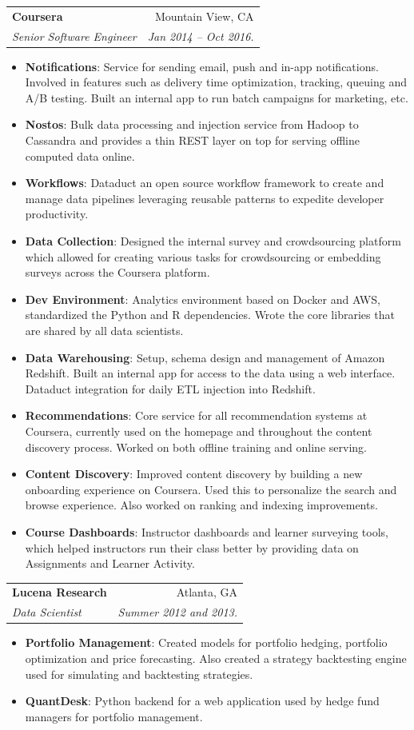 \documentclass[letterpaper,11pt]{article}
\makeatletter
\newcommand{\resumeItem}[2]{
  \item\small{
    \textbf{#1}{: #2 \vspace{-2pt}}
  }
}
\newcommand{\resumeSubheading}[4]{
  \vspace{-1pt}\item
    \begin{tabular*}{0.97\textwidth}[t]{l@{\extracolsep{\fill}}r}
      \textbf{#1} & #2 \\
      \textit{\small #3} & \textit{\small #4} \\
    \end{tabular*}\vspace{-5pt}
}
\newcommand{\resumeItemListStart}{\begin{itemize}}
\newcommand{\resumeItemListEnd}{\end{itemize}\vspace{-5pt}}
\makeatother
\begin{document}

    \resumeSubheading
      {Coursera}{Mountain View, CA}
      {Senior Software Engineer}{Jan 2014 -- Oct 2016.}
      \resumeItemListStart
        \resumeItem{Notifications}
          {Service for sending email, push and in-app notifications. Involved in features such as delivery time optimization, tracking, queuing and A/B testing. Built an internal app to run batch campaigns for marketing, etc.}
        \resumeItem{Nostos}
          {Bulk data processing and injection service from Hadoop to Cassandra and provides a thin REST layer on top for serving offline computed data online.}
        \resumeItem{Workflows}
          {Dataduct an open source workflow framework to create and manage data pipelines leveraging reusable patterns to expedite developer productivity.}
        \resumeItem{Data Collection}
          {Designed the internal survey and crowdsourcing platform which allowed for creating various tasks for crowdsourcing or embedding surveys across the Coursera platform.}
        \resumeItem{Dev Environment}
          {Analytics environment based on Docker and AWS, standardized the Python and R dependencies. Wrote the core libraries that are shared by all data scientists.}
        \resumeItem{Data Warehousing}
          {Setup, schema design and management of Amazon Redshift. Built an internal app for access to the data using a web interface. Dataduct integration for daily ETL injection into Redshift.}
        \resumeItem{Recommendations}
          {Core service for all recommendation systems at Coursera, currently used on the homepage and throughout the content discovery process. Worked on both offline training and online serving.}
        \resumeItem{Content Discovery}
          {Improved content discovery by building a new onboarding experience on Coursera. Used this to personalize the search and browse experience. Also worked on ranking and indexing improvements.}
        \resumeItem{Course Dashboards}
          {Instructor dashboards and learner surveying tools, which helped instructors run their class better by providing data on Assignments and Learner Activity.}
      \resumeItemListEnd

    \resumeSubheading
      {Lucena Research}{Atlanta, GA}
      {Data Scientist}{Summer 2012 and 2013.}
      \resumeItemListStart
        \resumeItem{Portfolio Management}
          {Created models for portfolio hedging, portfolio optimization and price forecasting. Also created a strategy backtesting engine used for simulating and backtesting strategies.}
        \resumeItem{QuantDesk}
          {Python backend for a web application used by hedge fund managers for portfolio management.}
      \resumeItemListEnd
\end{document}
